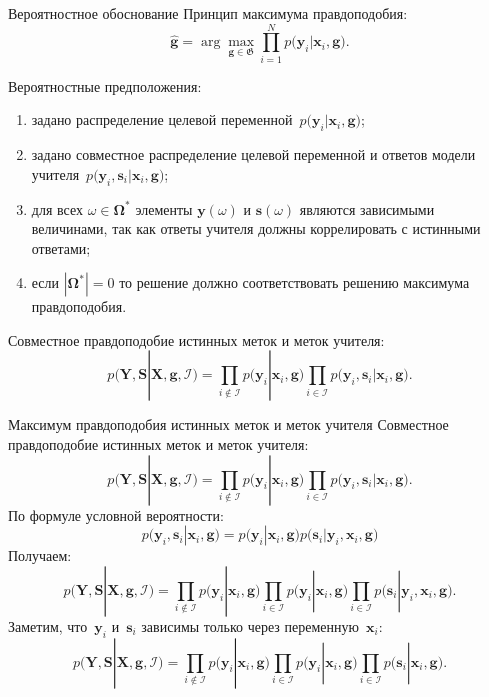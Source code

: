 \documentclass[9pt,pdf,hyperref={unicode}]{beamer}
\begin{document}
\begin{frame}{Вероятностное обоснование}
\justifying
Принцип максимума правдоподобия:
\[
\hat{\mathbf{g}} = \arg\max_{\mathbf{g}\in \mathfrak{G}} \prod_{i=1}^{N}p\bigr(\mathbf{y}_{i}|\mathbf{x}_i, \mathbf{g}\bigr).
\]

Вероятностные предположения:
\begin{enumerate}
	\item задано распределение целевой переменной~$p\bigr(\mathbf{y}_i|\mathbf{x}_i, \mathbf{g}\bigr)$;
	\item задано совместное распределение целевой переменной и ответов модели учителя~$p\bigr(\mathbf{y}_i, \mathbf{s}_i|\mathbf{x}_i, \mathbf{g}\bigr)$;
	\item для всех $\omega \in \bm{\Omega}^*$ элементы $\mathbf{y}(\omega)$ и $\mathbf{s}(\omega)$ являются зависимыми величинами, так как ответы учителя должны коррелировать с истинными ответами;
	\item если $|\bm{\Omega}^*|=0$ то решение должно соответствовать решению максимума правдоподобия.
\end{enumerate}
Совместное правдоподобие истинных меток и меток учителя:
\[
p\bigr(\mathbf{Y}, \mathbf{S}|\mathbf{X}, \mathbf{g}, \mathcal{I}\bigr)=\prod_{i\not\in \mathcal{I}}p\bigr(\mathbf{y}_i|\mathbf{x}_i, \mathbf{g}\bigr)\prod_{i\in \mathcal{I}}p\bigr(\mathbf{y}_i, \mathbf{s}_i|\mathbf{x}_i, \mathbf{g}\bigr).
\]
\end{frame}
\begin{frame}{Максимум правдоподобия истинных меток и меток учителя}
\justifying
Совместное правдоподобие истинных меток и меток учителя:
\[
p\bigr(\mathbf{Y}, \mathbf{S}|\mathbf{X}, \mathbf{g}, \mathcal{I}\bigr)=\prod_{i\not\in \mathcal{I}}p\bigr(\mathbf{y}_i|\mathbf{x}_i, \mathbf{g}\bigr)\prod_{i\in \mathcal{I}}p\bigr(\mathbf{y}_i, \mathbf{s}_i|\mathbf{x}_i, \mathbf{g}\bigr).
\]
По формуле условной вероятности:
\[
p\bigr(\mathbf{y}_i, \mathbf{s}_i|\mathbf{x}_i, \mathbf{g}\bigr) = p\bigr(\mathbf{y}_i|\mathbf{x}_i, \mathbf{g}\bigr)p\bigr(\mathbf{s}_i|\mathbf{y}_i, \mathbf{x}_i, \mathbf{g}\bigr)
\]
Получаем:
\[
p\bigr(\mathbf{Y}, \mathbf{S}|\mathbf{X}, \mathbf{g}, \mathcal{I}\bigr)=\prod_{i\not\in \mathcal{I}}p\bigr(\mathbf{y}_i|\mathbf{x}_i, \mathbf{g}\bigr)\prod_{i\in \mathcal{I}}p\bigr(\mathbf{y}_i|\mathbf{x}_i, \mathbf{g}\bigr)\prod_{i\in \mathcal{I}}p\bigr(\mathbf{s}_i|\mathbf{y}_i, \mathbf{x}_i, \mathbf{g}\bigr).
\]
Заметим, что~$\mathbf{y}_i$ и~$\mathbf{s}_i$ зависимы только через переменную~$\mathbf{x}_i$:
\[
p\bigr(\mathbf{Y}, \mathbf{S}|\mathbf{X}, \mathbf{g}, \mathcal{I}\bigr)=\prod_{i\not\in \mathcal{I}}p\bigr(\mathbf{y}_i|\mathbf{x}_i, \mathbf{g}\bigr)\prod_{i\in \mathcal{I}}p\bigr(\mathbf{y}_i|\mathbf{x}_i, \mathbf{g}\bigr)\prod_{i\in \mathcal{I}}p\bigr(\mathbf{s}_i|\mathbf{x}_i, \mathbf{g}\bigr).
\]

\end{frame}
\end{document}
